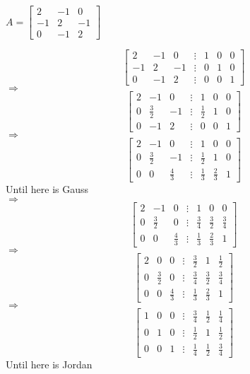 \documentclass[12pt,a4paper]{article}
\begin{document}
$
A = 
\begin{bmatrix}
  2 & -1 & 0 \\ 
  -1 & 2 & -1 \\
  0 & -1 & 2
\end{bmatrix}
$

\[
\begin{bmatrix}
  \boxed{2} & -1 & 0 & \vdots & 1 & 0 & 0 \\
  -1 & 2 & -1 & \vdots & 0 & 1 & 0 \\
  0 & -1 & 2 & \vdots & 0 & 0 & 1
\end{bmatrix}
\]
$\Rightarrow$
\[
\begin{bmatrix}
  2 & -1 & 0 & \vdots & 1 & 0 & 0 \\
  0 & \boxed{\frac{3}{2}} & -1 & \vdots & \frac{1}{2} & 1 & 0 \\
  0 & -1 & 2 & \vdots & 0 & 0 & 1
\end{bmatrix}
\]
$\Rightarrow$
\[
\begin{bmatrix}
  2 & -1 & 0 & \vdots & 1 & 0 & 0 \\
  0 & \frac{3}{2} & -1 & \vdots & \frac{1}{2} & 1 & 0 \\
  0 & 0 & \boxed{\frac{4}{3}} & \vdots & \frac{1}{3} & \frac{2}{3} & 1
\end{bmatrix}
\]
Until here is Gauss \\
$\Rightarrow$
\[
\begin{bmatrix}
  2 & -1 & 0 & \vdots & 1 & 0 & 0 \\
  0 & \frac{3}{2} & 0 & \vdots & \frac{3}{4} & \frac{3}{2} & \frac{3}{4} \\
  0 & 0 & \boxed{\frac{4}{3}} & \vdots & \frac{1}{3} & \frac{2}{3} & 1
\end{bmatrix}
\]
$\Rightarrow$
\[
\begin{bmatrix}
  2 & 0 & 0 & \vdots & \frac{3}{2} & 1 & \frac{1}{2} \\
  0 & \boxed{\frac{3}{2}} & 0 & \vdots & \frac{3}{4} & \frac{3}{2} & \frac{3}{4} \\
  0 & 0 & \boxed{\frac{4}{3}} & \vdots & \frac{1}{3} & \frac{2}{3} & 1
\end{bmatrix}
\]
$\Rightarrow$
\[
\begin{bmatrix}
  1 & 0 & 0 & \vdots & \frac{3}{4} & \frac{1}{2} & \frac{1}{4} \\
  0 & 1 & 0 & \vdots & \frac{1}{2} & 1 & \frac{1}{2} \\
  0 & 0 & 1 & \vdots & \frac{1}{4} & \frac{1}{2} & \frac{3}{4}
\end{bmatrix}
\]
Until here is Jordan \\
\end{document}
